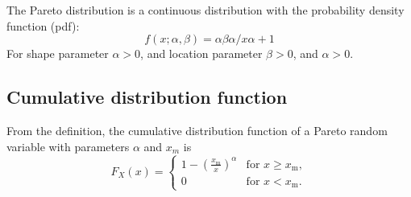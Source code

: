 \documentclass[]{report}
\begin{document}
The Pareto distribution is 
a continuous distribution with the probability density function (pdf):
\[
f(x; \alpha, \beta) = \alpha\beta\alpha / x\alpha+ 1
\]
For shape parameter $\alpha > 0$, and location parameter $\beta > 0$, and $\alpha > 0$.



\subsection{Cumulative distribution function}

From the definition, the cumulative distribution function of a Pareto random variable with parameters $\alpha$ and $x_m$ is
\[F_X(x) = \begin{cases}
1-\left(\frac{x_\mathrm{m}}{x}\right)^\alpha & \mbox{for } x \ge x_\mathrm{m}, \\
0 & \mbox{for }x < x_\mathrm{m}.
\end{cases}
\]
\end{document}
